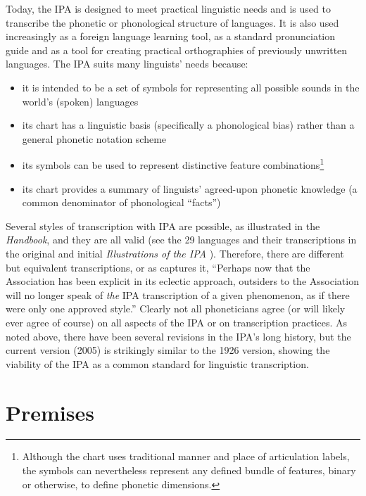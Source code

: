 Today, the IPA is designed to meet practical linguistic needs and is used to
transcribe the phonetic or phonological structure of languages. It is also used
increasingly as a foreign language learning tool, as a standard pronunciation
guide and as a tool for creating practical orthographies of previously unwritten
languages. The IPA suits many linguists' needs because:

\begin{itemize}

	\item it is intended to be a set of symbols for representing all possible
       sounds in the world's (spoken) languages
	\item its chart has a linguistic basis (specifically a phonological bias)
       rather than a general phonetic notation scheme
	\item its symbols can be used to represent distinctive feature
       combinations\footnote{Although the chart uses traditional manner and
       place of articulation labels, the symbols can nevertheless represent any
       defined bundle of features, binary or otherwise, to define phonetic
       dimensions.}
	\item its chart provides a summary of linguists' agreed-upon phonetic knowledge
       (a common denominator of phonological ``facts'') 

\end{itemize}

Several styles of transcription with IPA are possible, as illustrated in the
\textit{Handbook}, and they are all valid (see the 29 languages and their
transcriptions in the original and initial \textit{Illustrations of the IPA}
\citep[41--154]{IPA2007}). Therefore, there are different but equivalent
transcriptions, or as \citet[64]{Ladefoged1990a} captures it, ``Perhaps now that
the Association has been explicit in its eclectic approach, outsiders to the
Association will no longer speak of \textit{the} IPA transcription of a given
phenomenon, as if there were only one approved style.'' Clearly not all phoneticians agree (or will likely ever agree of course) on all 
aspects of the IPA or on transcription practices. As noted above, there have 
been several revisions in the IPA's long history, but the current version (2005) 
is strikingly similar to the 1926 version, showing the viability of the IPA as a 
common standard for linguistic transcription.

\section{Premises}
\label{IPApremises}

